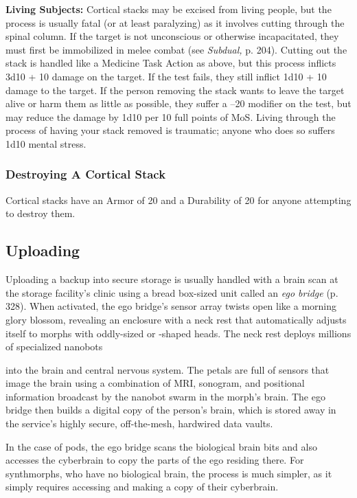 \textbf{Living Subjects:} Cortical stacks may be excised from living people, but the process is usually fatal (or at least paralyzing) as it involves cutting through the spinal column. If the target is not unconscious or otherwise incapacitated, they must first be immobilized in melee combat (see \textit{Subdual,} p. 204). Cutting out the stack is handled like a Medicine Task Action as above, but this process inflicts 3d10 + 10 damage on the target. If the test fails, they still inflict 1d10 + 10 damage to the target. If the person removing the stack wants to leave the target alive or harm them as little as possible, they suffer a –20 modifier on the test, but may reduce the damage by 1d10 per 10 full points of MoS. Living through the process of having your stack removed is traumatic; anyone who does so suffers 1d10 mental stress. 

\subsubsection{Destroying A Cortical Stack} 

Cortical stacks have an Armor of 20 and a Durability of 20 for anyone attempting to destroy them. 

\subsection{Uploading} 

Uploading a backup into secure storage is usually handled with a brain scan at the storage facility's clinic using a bread box-sized unit called an \textit{ego bridge} (p. 328). When activated, the ego bridge's sensor array twists open like a morning glory blossom, revealing an enclosure with a neck rest that automatically adjusts itself to morphs with oddly-sized or -shaped heads. The neck rest deploys millions of specialized nanobots 

into the brain and central nervous system. The petals are full of sensors that image the brain using a combination of MRI, sonogram, and positional information broadcast by the nanobot swarm in the morph's brain. The ego bridge then builds a digital copy of the person's brain, which is stored away in the service's highly secure, off-the-mesh, hardwired data vaults. 

In the case of pods, the ego bridge scans the biological brain bits and also accesses the cyberbrain to copy the parts of the ego residing there. For synthmorphs, who have no biological brain, the process is much simpler, as it simply requires accessing and making a copy of their cyberbrain. 

